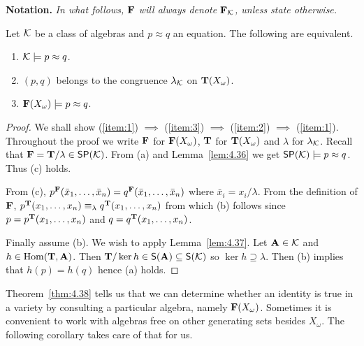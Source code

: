 \documentclass[12pt]{amsart}  %
\begin{document}
{\bf Notation.}
\emph{In what follows, $\mathbf{F}$ will always denote $\mathbf{F}_{\mathcal{K}}$, unless state otherwise.}

\begin{theorem}
  \label{thm:4.38}  
  Let $\mathcal{K}$ be a class of algebras and $p \approx q$ an equation. The 
  following are equivalent.
  \begin{enumerate}
    \item \label{item:1} $\mathcal{K} \models p\approx q$.
    \item \label{item:2} $(p,q)$ belongs to the congruence $\lambda_{\mathcal{K}}$ on $\mathbf{T}(X_\omega)$.
    \item \label{item:3} $\mathbf{F}(X_\omega) \models p\approx q$.
  \end{enumerate} 
\end{theorem}
\begin{proof} 
  We shall show 
  (\ref{item:1}) $\implies$ (\ref{item:3}) $\implies$ (\ref{item:2}) $\implies$ (\ref{item:1}).
  Throughout the proof we write $\mathbf{F}$ for $\mathbf{F}(X_\omega)$, $\mathbf{T}$ for 
  $\mathbf{T}(X_\omega)$ and $\lambda$ for $\lambda_{\mathcal{K}}$. 
  Recall that $\mathbf{F} = \mathbf{T}/\lambda \in \mathsf{S}\mathsf{P}(\mathcal{K})$. 
  From (a) and Lemma~\ref{lem:4.36} we get $\mathsf{S}\mathsf{P}(\mathcal{K}) \models p \approx q$. 
  Thus (c) holds.

  From (c), $p^{\mathbf{F}}(\bar{x}_1,\dots, \bar{x}_n) = q^{\mathbf{F}}(\bar{x}_1,\dots, \bar{x}_n)$
  where $\bar{x}_i = x_i/\lambda$. From the definition of $\mathbf{F}$, 
  $p^{\mathbf{T}}(x_1,\dots, x_n) \equiv_\lambda q^{\mathbf{T}}(x_1,\dots, x_n)$
  from which (b) follows since $p = p^{\mathbf{T}}(x_1,\dots, x_n)$ and $q = q^{\mathbf{T}}(x_1,\dots, x_n)$.

  Finally assume (b). We wish to apply Lemma~\ref{lem:4.37}. 
  Let $\mathbf{A} \in \mathcal{K}$ and $h \in \operatorname{Hom}(\mathbf{T},\mathbf{A})$. 
  Then $\mathbf{T}/\ker h \in \mathsf{S}(\mathbf{A}) \subseteq \mathsf{S}(\mathcal{K})$ so $\ker h \supseteq \lambda$. 
  Then (b) implies that $h(p) = h(q)$ hence (a) holds.
\end{proof}

Theorem~\ref{thm:4.38} tells us that we can determine whether an identity is true 
in a variety by consulting a particular algebra, namely $\mathbf{F}(X_\omega)$. 
Sometimes it is convenient to work with algebras free on other generating sets besides 
$X_\omega$. The following corollary takes care of that for us.
\end{document}
